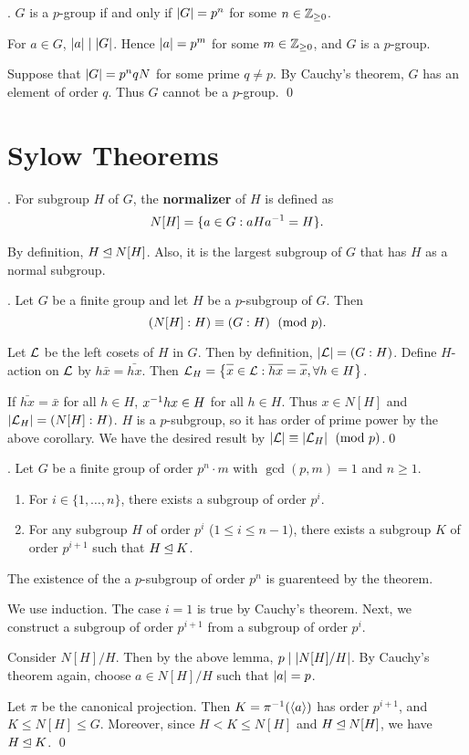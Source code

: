 \cor. \(G\) is a \(p\)-group if and only if \(\left| G \right| = p^n\) for some \(n \in \mathbb{Z}_{\geq 0}\).

\pf \note{\mimpd} For \(a \in G\), \(\left| a \right| \mid \left| G \right|\). Hence \(\left| a \right| = p^m\) for some \(m \in \mathbb{Z}_{\geq 0}\), and \(G\) is a \(p\)-group.

\note{\mimp} Suppose that \(\left| G \right| = p^n q N\) for some prime \(q \neq p\). By Cauchy's theorem, \(G\) has an element of order \(q\). Thus \(G\) cannot be a \(p\)-group. \qed

\section*{Sylow Theorems}

.  For subgroup \(H\) of \(G\), the \textbf{normalizer} of \(H\) is defined as
\[
    N[H] = \{a \in G : aHa^{-1} = H\}.
\]

By definition, \(H \unlhd N[H]\). Also, it is the largest subgroup of \(G\) that has \(H\) as a normal subgroup.

\lemma. Let \(G\) be a finite group and let \(H\) be a \(p\)-subgroup of \(G\). Then
\[
    \left(N[H] : H\right) \equiv \left(G : H\right) \pmod p.
\]

\pf Let \(\mathcal{L}\) be the left cosets of \(H\) in \(G\). Then by definition, \(\left| \mathcal{L} \right| = \left(G : H\right)\). Define \(H\)-action on \(\mathcal{L}\) by \(h\bar{x} = \bar{hx}\). Then \(\mc{L}_H = \left\{\bar{x} \in \mc{L} : \bar{hx} = \bar{x}, \forall h \in H\right\}\).

If \(\bar{hx} = \bar{x}\) for all \(h \in H\), \(x^{-1} h x \in H\) for all \(h \in H\). Thus \(x \in N[H]\) and \(\left| \mathcal{L}_H \right| = \left(N[H] : H\right)\). \(H\) is a \(p\)-subgroup, so it has order of prime power by the above corollary. We have the desired result by \(\left| \mathcal{L} \right| \equiv \left| \mathcal{L}_H \right| \pmod p\).\qed

\bigskip

\thm.  Let \(G\) be a finite group of order \(p^n \cdot m\) with \(\gcd(p, m) = 1\) and \(n \geq 1\).
\begin{enumerate}
    \item For \(i \in \{1, \dots, n\}\), there exists a subgroup of order \(p^i\).
    \item For any subgroup \(H\) of order \(p^i\) (\(1 \leq i \leq n - 1\)), there exists a subgroup \(K\) of order \(p^{i+1}\) such that \(H \unlhd K\).
\end{enumerate}

The existence of the a \(p\)-subgroup of order \(p^n\) is guarenteed by the theorem.

\pf We use induction. The case \(i = 1\) is true by Cauchy's theorem. Next, we construct a subgroup of order \(p^{i+1}\) from a subgroup of order \(p^i\).

Consider \(N[H]/H\). Then by the above lemma, \(p \mid \left| N[H]/H \right|\). By Cauchy's theorem again, choose \(a \in N[H]/H\) such that \(\left| a \right| = p\).

Let \(\pi\) be the canonical projection. Then \(K = \pi^{-1}(\left\langle a \right\rangle)\) has order \(p^{i+1}\), and \(K \leq N[H] \leq G\). Moreover, since \(H < K \leq N[H]\) and \(H \unlhd N[H]\), we have \(H \unlhd K\). \qed

